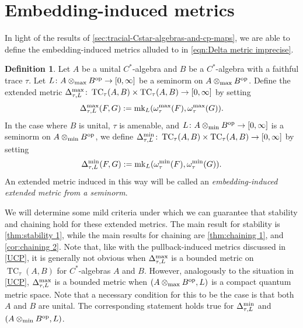 \documentclass[11pt, a4paper, oneside, final, reqno]{amsart}
\newcommand{\TC}{\operatorname{TC}}
\newcommand{\mk}{\operatorname{mk}}
\theoremstyle{definition}
\newtheorem{definition}{Definition}[section]
\theoremstyle{plain}
\theoremstyle{remark}
\numberwithin{equation}{section}
\begin{document}
\section{Embedding-induced metrics}\label{sec:induced-metrics-between-cp-maps}

In light of the results of \cref{sec:tracial-Cstar-algebras-and-cp-maps}, we are able to define the embedding-induced metrics alluded to in \eqref{eqn:Delta metric imprecise}.

\begin{definition}\label{def:TC metric Delta}
    Let $A$ be a unital $C^*$-algebra and $B$ be a $C^*$-algebra with a faithful trace $\tau$. Let $L \colon A \otimes_{\rm max} B^{\rm op} \to [0,\infty]$ be a seminorm on $A \otimes_{\rm max} B^{\rm op}$. Define the extended metric $\Delta_{\tau, L}^{\rm max} \colon \TC_\tau(A,B) \times \TC_\tau(A,B) \to [0, \infty]$ by setting
    \begin{equation}\label{eqn:TC metric Delta max def}
        \Delta_{\tau, L}^{\rm max}(F,G) := \mk_L(\omega_\tau^{\rm max}(F),\omega_\tau^{\rm max}(G)).
    \end{equation}
    In the case where $B$ is unital, $\tau$ is amenable, and $L \colon A \otimes_{\rm min} B^{\rm op} \to [0,\infty]$ is a seminorm on $A \otimes_{\rm min} B^{\rm op}$, we define $\Delta_{\tau, L}^{\rm min} \colon \TC_\tau(A,B) \times \TC_\tau(A,B) \to [0, \infty]$ by setting
    \begin{equation}\label{eqn:TC metric Delta min def}
        \Delta_{\tau, L}^{\rm min}(F,G) := \mk_L(\omega_\tau^{\rm min}(F),\omega_\tau^{\rm min}(G)).
    \end{equation}
    An extended metric induced in this way will be called an \emph{embedding-induced extended metric from a seminorm}.
\end{definition}

We will determine some mild criteria under which we can guarantee that stability and chaining hold for these extended metrics. The main result for stability is \cref{thm:stability 1}, while the main results for chaining are \cref{thm:chaining 1}, and \cref{cor:chaining 2}. Note that, like with the pullback-induced metrics discussed in \cref{UCP}, it is generally not obvious when $\Delta_{\tau, L}^{\rm max}$ is a bounded metric on $\TC_\tau(A,B)$ for $C^*$-algebras $A$ and $B$. However, analogously to the situation in \cref{UCP}, $\Delta_{\tau, L}^{\rm max}$ is a bounded metric when $(A \otimes_{\rm max} B^{\rm op}, L)$ is a compact quantum metric space. Note that a necessary condition for this to be the case is that both $A$ and $B$ are unital. The corresponding statement holds true for $\Delta_{\tau, L}^{\rm min}$ and $(A \otimes_{\rm min} B^{\rm op}, L)$. 
\end{document}
